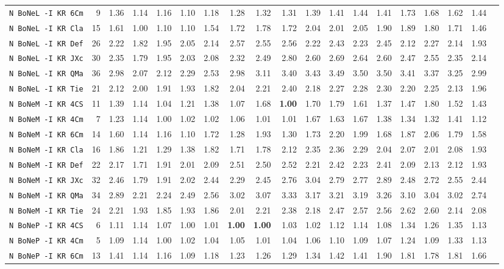 \begin{tabular}{l | r @{~~} r | r@{~~}r@{~~}r@{~~}r@{~~}r@{~~}r@{~~}r@{~~}r@{~~}r@{~~}r@{~~}r@{~~}r@{~~}r@{~~}r@{~~}r@{~~}r|}
\verb+N BoNeL -I KR 6Cm+ & 9 & 1.36 & 1.14&1.16&1.10&1.18&1.28&1.32&1.31&1.39&1.41&1.44&1.41&1.73&1.68&1.62&1.44\\
\verb+N BoNeL -I KR Cla+ & 15 & 1.61 & 1.00&1.10&1.10&1.54&1.72&1.78&1.72&2.04&2.01&2.05&1.90&1.89&1.80&1.71&1.46\\
\verb+N BoNeL -I KR Def+ & 26 & 2.22 & 1.82&1.95&2.05&2.14&2.57&2.55&2.56&2.22&2.43&2.23&2.45&2.12&2.27&2.14&1.93\\
\verb+N BoNeL -I KR JXc+ & 30 & 2.35 & 1.79&1.95&2.03&2.08&2.32&2.49&2.80&2.60&2.69&2.64&2.60&2.47&2.55&2.35&2.14\\
\verb+N BoNeL -I KR QMa+ & 36 & 2.98 & 2.07&2.12&2.29&2.53&2.98&3.11&3.40&3.43&3.49&3.50&3.50&3.41&3.37&3.25&2.99\\
\verb+N BoNeL -I KR Tie+ & 21 & 2.12 & 2.00&1.91&1.93&1.82&2.04&2.21&2.40&2.18&2.27&2.28&2.30&2.20&2.25&2.13&1.96\\
\verb+N BoNeM -I KR 4CS+ & 11 & 1.39 & 1.14&1.04&1.21&1.38&1.07&1.68&\textbf{1.00}&1.70&1.79&1.61&1.37&1.47&1.80&1.52&1.43\\
\verb+N BoNeM -I KR 4Cm+ & 7 & 1.23 & 1.14&1.00&1.02&1.02&1.06&1.01&1.01&1.67&1.63&1.67&1.38&1.34&1.32&1.41&1.12\\
\verb+N BoNeM -I KR 6Cm+ & 14 & 1.60 & 1.14&1.16&1.10&1.72&1.28&1.93&1.30&1.73&2.20&1.99&1.68&1.87&2.06&1.79&1.58\\
\verb+N BoNeM -I KR Cla+ & 16 & 1.86 & 1.21&1.29&1.38&1.82&1.71&1.78&2.12&2.35&2.36&2.29&2.04&2.07&2.01&2.08&1.93\\
\verb+N BoNeM -I KR Def+ & 22 & 2.17 & 1.71&1.91&2.01&2.09&2.51&2.50&2.52&2.21&2.42&2.23&2.41&2.09&2.13&2.12&1.93\\
\verb+N BoNeM -I KR JXc+ & 32 & 2.46 & 1.79&1.91&2.02&2.44&2.29&2.45&2.76&3.04&2.79&2.77&2.89&2.48&2.72&2.55&2.44\\
\verb+N BoNeM -I KR QMa+ & 34 & 2.89 & 2.21&2.24&2.49&2.56&3.02&3.07&3.33&3.17&3.21&3.19&3.26&3.10&3.04&3.02&2.74\\
\verb+N BoNeM -I KR Tie+ & 24 & 2.21 & 1.93&1.85&1.93&1.86&2.01&2.21&2.38&2.18&2.47&2.57&2.56&2.62&2.60&2.14&2.08\\
\verb+N BoNeP -I KR 4CS+ & 6 & 1.11 & 1.14&1.07&1.00&1.01&\textbf{1.00}&\textbf{1.00}&1.03&1.02&1.12&1.14&1.08&1.34&1.26&1.35&1.13\\
\verb+N BoNeP -I KR 4Cm+ & 5 & 1.09 & 1.14&1.00&1.02&1.04&1.05&1.01&1.04&1.06&1.10&1.09&1.07&1.24&1.09&1.33&1.13\\
\verb+N BoNeP -I KR 6Cm+ & 13 & 1.41 & 1.14&1.16&1.09&1.18&1.23&1.26&1.29&1.34&1.42&1.41&1.90&1.81&1.78&1.81&1.66\\

\end{tabular}
